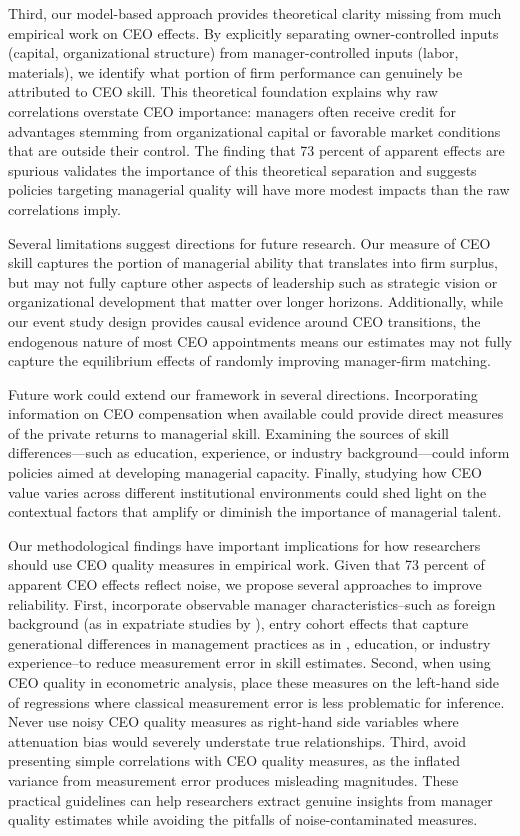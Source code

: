 \documentclass[11pt,a4paper]{article}
\begin{document}
Third, our model-based approach provides theoretical clarity missing from much empirical work on CEO effects. By explicitly separating owner-controlled inputs (capital, organizational structure) from manager-controlled inputs (labor, materials), we identify what portion of firm performance can genuinely be attributed to CEO skill. This theoretical foundation explains why raw correlations overstate CEO importance: managers often receive credit for advantages stemming from organizational capital or favorable market conditions that are outside their control. The finding that 73 percent of apparent effects are spurious validates the importance of this theoretical separation and suggests policies targeting managerial quality will have more modest impacts than the raw correlations imply.

Several limitations suggest directions for future research. Our measure of CEO skill captures the portion of managerial ability that translates into firm surplus, but may not fully capture other aspects of leadership such as strategic vision or organizational development that matter over longer horizons. Additionally, while our event study design provides causal evidence around CEO transitions, the endogenous nature of most CEO appointments means our estimates may not fully capture the equilibrium effects of randomly improving manager-firm matching.

Future work could extend our framework in several directions. Incorporating information on CEO compensation when available could provide direct measures of the private returns to managerial skill. Examining the sources of skill differences---such as education, experience, or industry background---could inform policies aimed at developing managerial capacity. Finally, studying how CEO value varies across different institutional environments could shed light on the contextual factors that amplify or diminish the importance of managerial talent.

Our methodological findings have important implications for how researchers should use CEO quality measures in empirical work. Given that 73 percent of apparent CEO effects reflect noise, we propose several approaches to improve reliability. First, incorporate observable manager characteristics\---such as foreign background (as in expatriate studies by \citet{Koren2023expat}), entry cohort effects that capture generational differences in management practices as in \citet{koren2024managers}, education, or industry experience\---to reduce measurement error in skill estimates. Second, when using CEO quality in econometric analysis, place these measures on the left-hand side of regressions where classical measurement error is less problematic for inference. Never use noisy CEO quality measures as right-hand side variables where attenuation bias would severely understate true relationships. Third, avoid presenting simple correlations with CEO quality measures, as the inflated variance from measurement error produces misleading magnitudes. These practical guidelines can help researchers extract genuine insights from manager quality estimates while avoiding the pitfalls of noise-contaminated measures.
\end{document}
